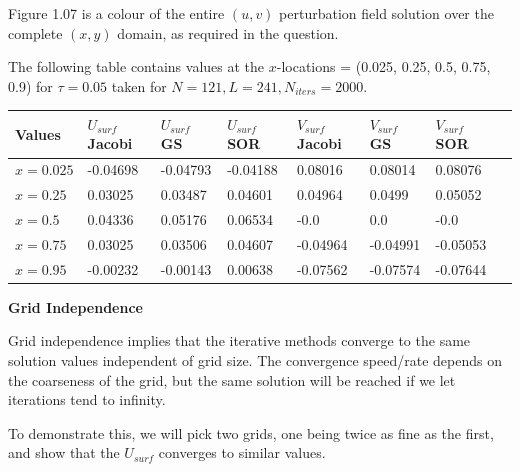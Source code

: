 \documentclass[12pt]{article}
\begin{document}
    \vspace{-0.5cm}
    Figure 1.07 is a colour of the entire $(u, v)$ perturbation field solution over the complete $(x, y)$ domain, as required in the question.

    The following table contains values at the $x$-locations = (0.025, 0.25, 0.5, 0.75, 0.9) for $\tau = 0.05$ taken for $N = 121, L = 241, N_{iters}=2000.$

    \begin{center}
    \begin{tabular}{llllllll}
    \toprule
     Values & $U_{surf}$ Jacobi & $U_{surf}$ GS & $U_{surf}$ SOR & $V_{surf}$ Jacobi & $V_{surf}$ GS & $V_{surf}$ SOR\\
    \midrule
    $x = 0.025$ & -0.04698 & -0.04793 & -0.04188 & 0.08016 & 0.08014 & 0.08076 \\
    $x = 0.25$ & 0.03025 & 0.03487 & 0.04601 & 0.04964 & 0.0499 & 0.05052 \\
    $x = 0.5$ & 0.04336 & 0.05176 & 0.06534 & -0.0 & 0.0 & -0.0 \\
    $x = 0.75$ & 0.03025 & 0.03506 & 0.04607 & -0.04964 & -0.04991 & -0.05053 \\
    $x = 0.95$ & -0.00232 & -0.00143 & 0.00638 & -0.07562 & -0.07574 & -0.07644 \\
    \bottomrule
    \end{tabular}
    \end{center}

    \newpage
    \textbf{Grid Independence}

    Grid independence implies that the iterative methods converge to the same solution values independent of grid size. The convergence speed/rate depends on the coarseness of the grid, but the same solution will be reached if we let iterations tend to infinity.

    To demonstrate this, we will pick two grids, one being twice as fine as the first, and show that the $U_{surf}$ converges to similar values.
\end{document}
